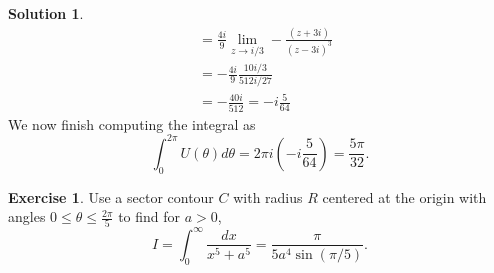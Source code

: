 \documentclass[12pt]{article}
\theoremstyle{definition}
\newtheorem{exer}{Exercise}
\newtheorem{sol}{Solution}
\theoremstyle{remark}
\begin{document}
\begin{sol}
\begin{align}
                                                   &=\frac{4i}{9} \lim\limits_{z\to i/3} -\frac{(z+3i)}{(z-3i)^3}\\
                                                   &= -\frac{4i}{9} \frac{10i/3}{512i/27} \\
                                                   &= - \frac{40i}{512} = -i\frac{5}{64}
\end{align}
We now finish computing the integral as
\begin{equation}
    \int_0^{2\pi} U(\theta)d\theta = 2\pi i  \left(-i\frac{5}{64}\right) = \frac{5\pi}{32}.
\end{equation}
\end{sol}

\newpage

\begin{exer}
    Use a sector contour $C$ with radius $R$ centered at the origin with angles $0\leq \theta\leq \frac{2\pi}{5}$ to find for $a>0$,
    \begin{equation*}
       I =  \int_0^\infty \frac{dx}{x^5+a^5} = \frac{\pi}{5a^4\sin(\pi/5)}.  
    \end{equation*}
\end{exer}
\end{document}
